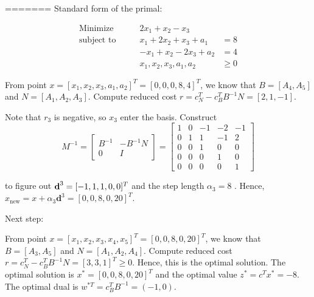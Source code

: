 \documentclass[12pt]{article}
\begin{document}
=======
Standard form of the primal:

$$
\begin{aligned}
\text{Minimize} \qquad & 2x_1 + x_2 - x_3 &  \\
\text{subject\  to} \qquad & x_1 + 2x_2 + x_3 + a_1 & = 8\\
 & -x_1 + x_2 -2x_3 + a_2 & = 4 \\
 & x_1, x_2, x_3, a_1, a_2 & \geqslant 0
\end{aligned}
$$ 



From point $x = [x_1, x_2, x_3, a_1, a_2]^T = [0, 0, 0, 8, 4]^T$, we know that $B = [A_4, A_5]$ and $N = [A_1, A_2, A_3]$. Compute reduced cost $r = c_N^T - c_B^TB^{-1}N = [2, 1, -1]$.

Note that $r_3$ is negative, so $x_3$ enter the basis. Construct $$
M^{-1} = \begin{bmatrix}
B^{-1} & -B^{-1}N \\
 0 & I
\end{bmatrix} = \begin{bmatrix}
1 & 0 & -1 & -2 & -1 \\
0 & 1 & 1 & -1 & 2 \\
0 & 0 & 1 & 0 & 0 \\
0 & 0 & 0 & 1 & 0 \\
0 & 0 & 0 & 0 & 1
\end{bmatrix}
$$ 

to figure out $\textbf d^3 = [-1, 1, 1, 0, 0]^T$  and the step length $\alpha_3 = 8$ . Hence, $x_{\text{new}} = x + \alpha_3\textbf{d}^3 = [0, 0, 8, 0, 20]^T$. 

Next step:

From point $x = [x_1, x_2, x_3, x_4, x_5]^T = [0, 0, 8, 0, 20]^T$, we know that $B = [A_3, A_5]$ and $N = [A_1, A_2, A_4]$. Compute reduced cost $r = c_N^T - c_B^TB^{-1}N = [3,3,1]^T \geqslant 0$. Hence, this is the optimal solution. The optimal solution is $x^* = [0, 0, 8, 0, 20]^T$ and the optimal value $z^* = c^Tx^* = -8 $. The optimal dual is $w^{*T} = c^T_BB^{-1} = (-1, 0)$.
\end{document}
